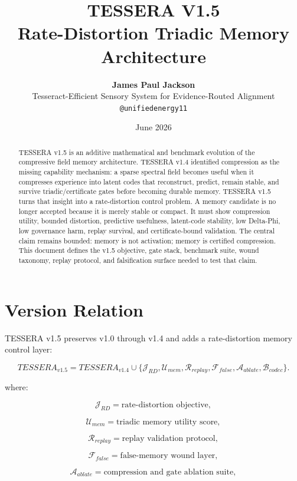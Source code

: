 \documentclass[12pt]{article}
\title{\textbf{TESSERA V1.5}\\
\large Rate-Distortion Triadic Memory Architecture}
\author{\textbf{James Paul Jackson}\\[4pt]
\small Tesseract-Efficient Sensory System for Evidence-Routed Alignment\\
\small \texttt{@unifiedenergy11}}
\date{June 2026}
\begin{document}
\maketitle

\begin{abstract}
TESSERA v1.5 is an additive mathematical and benchmark evolution of the
compressive field memory architecture. TESSERA v1.4 identified compression as
the missing capability mechanism: a sparse spectral field becomes useful when it
compresses experience into latent codes that reconstruct, predict, remain
stable, and survive triadic/certificate gates before becoming durable memory.
TESSERA v1.5 turns that insight into a rate-distortion control problem. A memory
candidate is no longer accepted because it is merely stable or compact. It must
show compression utility, bounded distortion, predictive usefulness, latent-code
stability, low Delta-Phi, low governance harm, replay survival, and
certificate-bound validation. The central claim remains bounded: memory is not
activation; memory is certified compression. This document defines the v1.5
objective, gate stack, benchmark suite, wound taxonomy, replay protocol, and
falsification surface needed to test that claim.
\end{abstract}

\section{Version Relation}

TESSERA v1.5 preserves v1.0 through v1.4 and adds a rate-distortion memory
control layer:

\[
\boxed{
TESSERA_{v1.5}
=
TESSERA_{v1.4}
\cup
\{\mathcal{J}_{RD},\mathcal{U}_{mem},\mathcal{R}_{replay},\mathcal{F}_{false},
\mathcal{A}_{ablate},\mathcal{B}_{codec}\}.
}
\]

where:

\[
\mathcal{J}_{RD}=\text{rate-distortion objective},
\]

\[
\mathcal{U}_{mem}=\text{triadic memory utility score},
\]

\[
\mathcal{R}_{replay}=\text{replay validation protocol},
\]

\[
\mathcal{F}_{false}=\text{false-memory wound layer},
\]

\[
\mathcal{A}_{ablate}=\text{compression and gate ablation suite},
\]
\end{document}

